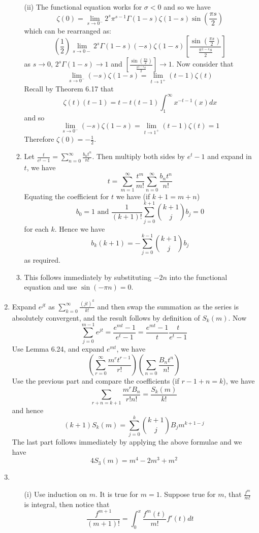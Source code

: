 \begin{enumerate}
\begin{enumerate}
\item[(ii)]
The functional equation works for $\sigma <0$ and so we have
$$\zeta(0)=\lim_{s \to 0^-}2^s \pi^{s-1}\Gamma(1-s)\zeta(1-s)\sin{\left(\frac{\pi s}{2}\right)}$$
which can be rearranged as:
$$\left(\frac{1}{2}\right)\lim_{s \to 0-}2^s \Gamma(1-s)(-s)\zeta(1-s)\left[\frac{\sin{\left(\frac{\pi s}{2}\right)}}{\frac{\pi^{1-s} s}{2}}\right]$$
as $s \to 0$, $2^s \Gamma(1-s) \to 1$ and $\left[\frac{\sin{\left(\frac{\pi s}{2}\right)}}{\frac{\pi^{1-s} s}{2}}\right] \to 1$. Now consider that
$$\lim_{s \to 0^-}(-s)\zeta(1-s)=\lim_{t \to 1^+}(t-1)\zeta(t)$$
Recall by Theorem 6.17 that
$$\zeta(t) (t-1)=t -t(t-1)\int_1^\infty x^{-t-1}(x)dx$$
and so
$$\lim_{s \to 0^-}(-s)\zeta(1-s)=\lim_{t \to 1^+}(t-1)\zeta(t)=1$$
Therefore $\zeta(0)=-\frac{1}{2}$.
\item Let $\frac{t}{e^t-1}=\sum_{n=0}^\infty \frac{b_n t^n}{n!}$. Then multiply both sides by
$e^t-1$ and expand in $t$, we have
$$t=\sum_{m=1}^\infty \frac{t^m}{m!}\sum_{n=0}^\infty \frac{b_n t^n}{n!}$$
Equating the coefficient for $t$ we have (if $k+1=m+n$)
$$b_0=1 \text{ and } \frac{1}{(k+1)!}\sum_{j=0}^{k+1}\binom{k+1}{j}b_j=0$$
for each $k$. Hence we have
$$b_k(k+1)=-\sum_{j=0}^{k-1}\binom{k+1}{j} b_j$$ as required.
\item This follows immediately by substituting $-2n$ into the functional equation and use
$\sin{(-\pi n )}=0$.
\end{enumerate}
\item Expand $e^{jt}$ as $\sum_{k=0}^\infty \frac{(jt)^k}{k!}$ and then swap the summation as the series is absolutely convergent, and the result follows by definition of $S_k(m)$. Now
    $$\sum_{j=0}^{m-1}e^{jt}=\frac{e^{mt}-1}{e^t-1}=\frac{e^{mt}-1}{t}\frac{t}{e^t-1}$$
    Use Lemma 6.24, and expand $e^{mt}$, we have
    $$\left(\sum_{r=0}^\infty \frac{m^rt^{r-1}}{r!}\right)\left(\sum_{n=0}\frac{B_n t^n}{n!}\right)$$
    Use the previous part and compare the coefficients (if $r-1+n=k$), we have
    $$\sum_{r+n=k+1} \frac{m^r B_n}{r! n!}= \frac{S_k(m)}{k!}$$
    and hence $$(k+1)S_k(m)=\sum_{j=0}^k \binom{k+1}{j}B_jm^{k+1-j}$$
    The last part follows immediately by applying the above formulae and we have
    $$4S_3(m)=m^4-2m^3+m^2$$
\item \begin{enumerate}
      \item[(i)] Use induction on $m$. It is true for $m=1$.
      Suppose true for $m$, that $\frac{f^m}{m!}$ is integral, then notice that
      $$\frac{f^{m+1}}{(m+1)!}=\int_0^x \frac{f^{m}(t)}{m!}f'(t) dt$$

\end{enumerate}
\end{enumerate}
